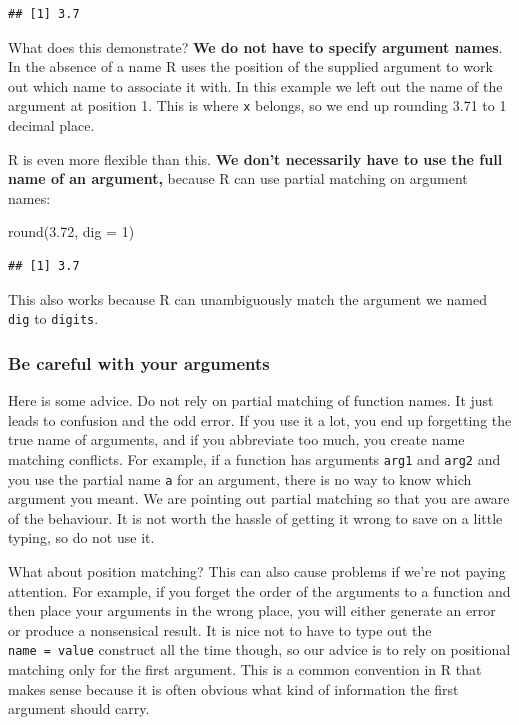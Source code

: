 \documentclass[
]{book}
\newenvironment{Shaded}{\begin{snugshade}}{\end{snugshade}}
\newcommand{\AttributeTok}[1]{\textcolor[rgb]{0.77,0.63,0.00}{#1}}
\newcommand{\DecValTok}[1]{\textcolor[rgb]{0.00,0.00,0.81}{#1}}
\newcommand{\FloatTok}[1]{\textcolor[rgb]{0.00,0.00,0.81}{#1}}
\newcommand{\FunctionTok}[1]{\textcolor[rgb]{0.00,0.00,0.00}{#1}}
\newcommand{\NormalTok}[1]{#1}
\newenvironment{greybox}{
  \definecolor{shadecolor}{rgb}{0.95,0.95,0.95}  %
  \color{black}
  \begin{shaded}}
 {\end{shaded}}
\newenvironment{infobox}[1]
  {
  \begin{itemize}
  \renewcommand{\labelitemi}{
    \raisebox{-.7\height}[0pt][0pt]{
      {\setkeys{Gin}{width=3em,keepaspectratio}
        \texttt{[image: images/\#1]}}
    }
  }
  \setlength{\fboxsep}{1em}
  \begin{greybox}
  \item
  }
  {
  \end{greybox}
  \end{itemize}
  }
\begin{document}
\begin{verbatim}
## [1] 3.7
\end{verbatim}

What does this demonstrate? \textbf{We do not have to specify argument names}. In the absence of a name R uses the position of the supplied argument to work out which name to associate it with. In this example we left out the name of the argument at position 1. This is where \texttt{x} belongs, so we end up rounding 3.71 to 1 decimal place.

R is even more flexible than this. \textbf{We don't necessarily have to use the full name of an argument,} because R can use partial matching on argument names:

\begin{Shaded}
\begin{Highlighting}[]
\FunctionTok{round}\NormalTok{(}\FloatTok{3.72}\NormalTok{, }\AttributeTok{dig =} \DecValTok{1}\NormalTok{)}
\end{Highlighting}
\end{Shaded}

\begin{verbatim}
## [1] 3.7
\end{verbatim}

This also works because R can unambiguously match the argument we named \texttt{dig} to \texttt{digits}.

\begin{infobox}{warning}

\hypertarget{be-careful-with-your-arguments}{%
\subsubsection*{Be careful with your arguments}\label{be-careful-with-your-arguments}}

Here is some advice. Do not rely on partial matching of function names. It just leads to confusion and the odd error. If you use it a lot, you end up forgetting the true name of arguments, and if you abbreviate too much, you create name matching conflicts. For example, if a function has arguments \texttt{arg1} and \texttt{arg2} and you use the partial name \texttt{a} for an argument, there is no way to know which argument you meant. We are pointing out partial matching so that you are aware of the behaviour. It is not worth the hassle of getting it wrong to save on a little typing, so do not use it.

What about position matching? This can also cause problems if we're not paying attention. For example, if you forget the order of the arguments to a function and then place your arguments in the wrong place, you will either generate an error or produce a nonsensical result. It is nice not to have to type out the \texttt{name\ =\ value} construct all the time though, so our advice is to rely on positional matching only for the first argument. This is a common convention in R that makes sense because it is often obvious what kind of information the first argument should carry.

\end{infobox}
\end{document}
